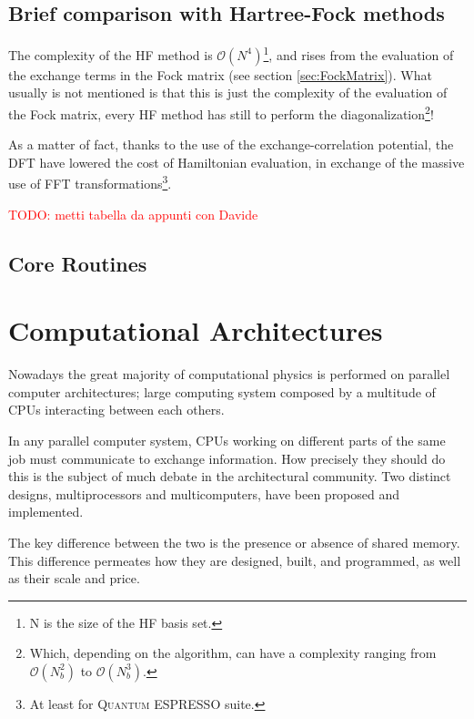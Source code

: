 \documentclass[a4paper,12pt]{article}
\newcommand\mynotes[1]{\begin{flushright}

\textcolor{red}{TODO: #1}\end{flushright}}
\newcommand\QE{\textsc{Quantum} ESPRESSO }
\newcommand\bigO{\mathcal{O}}
\begin{document}
\subsection{Brief comparison with Hartree-Fock methods}
The complexity of the HF method is $\bigO(N^4)$\footnote{N is the size of the HF basis set.}, and rises from the evaluation of the exchange terms in the Fock matrix (see section \ref{sec:FockMatrix}). 
What usually is not mentioned is that this is just the complexity of the evaluation of the Fock matrix, every HF method has still to perform the diagonalization\footnote{Which, depending on the algorithm, can have a complexity ranging from $\bigO(N_{b}^2)$ to $\bigO(N_{b}^3)$.}!

As a matter of fact, thanks to the use of the exchange-correlation potential, the DFT have lowered the cost of Hamiltonian evaluation, in exchange of the massive use of FFT transformations\footnote{At least for \QE suite.}.





\mynotes{metti tabella da appunti con Davide}














\newpage
\subsection{Core Routines}\label{sec:CoreRoutines}



\newpage
\section{Computational Architectures} \label{sec:comparch}

Nowadays the great majority of computational physics is performed on parallel computer architectures; large computing system composed by a multitude of CPUs interacting between each others.

In any parallel computer system, CPUs working on different parts of the same job must communicate to exchange information. How precisely they should do this is the subject of much debate in the architectural community. 
Two distinct designs, multiprocessors and multicomputers, have been proposed and implemented.

The key difference between the two is the presence or absence of shared memory.
This difference permeates how they are designed, built, and programmed, as well as their scale and price\cite[p.586]{Tanenbaum}.
\end{document}
